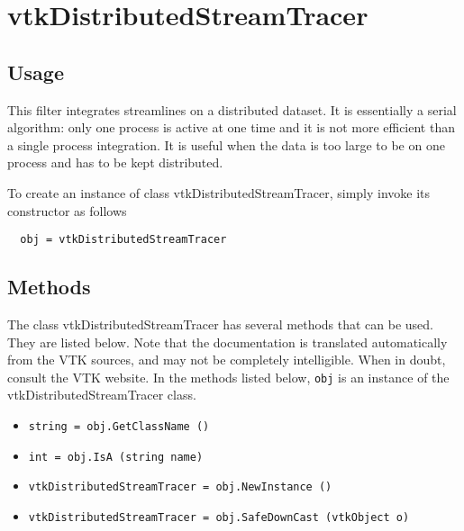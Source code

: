 \section{vtkDistributedStreamTracer}

\subsection{Usage}

 This filter integrates streamlines on a distributed dataset. It is
 essentially a serial algorithm: only one process is active at one
 time and it is not more efficient than a single process integration.
 It is useful when the data is too large to be on one process and
 has to be kept distributed.

To create an instance of class vtkDistributedStreamTracer, simply
invoke its constructor as follows
\begin{verbatim}
  obj = vtkDistributedStreamTracer
\end{verbatim}
\subsection{Methods}

The class vtkDistributedStreamTracer has several methods that can be used.
  They are listed below.
Note that the documentation is translated automatically from the VTK sources,
and may not be completely intelligible.  When in doubt, consult the VTK website.
In the methods listed below, \verb|obj| is an instance of the vtkDistributedStreamTracer class.
\begin{itemize}
\item  \verb|string = obj.GetClassName ()|

\item  \verb|int = obj.IsA (string name)|

\item  \verb|vtkDistributedStreamTracer = obj.NewInstance ()|

\item  \verb|vtkDistributedStreamTracer = obj.SafeDownCast (vtkObject o)|

\end{itemize}
